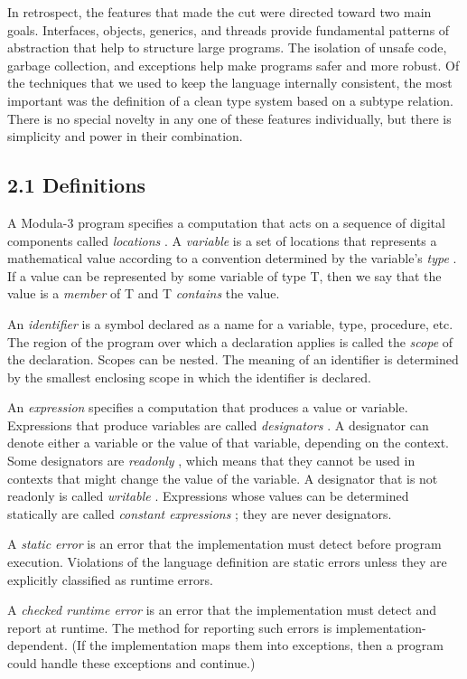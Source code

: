 \documentclass[10pt]{article}
\begin{document}
In retrospect, the features that made the cut were directed toward two main
goals. Interfaces, objects, generics, and threads provide fundamental patterns
of abstraction that help to structure large programs. The isolation of unsafe
code, garbage collection, and exceptions help make programs safer and more
robust. Of the techniques that we used to keep the language internally
consistent, the most important was the definition of a clean type system based
on a subtype relation. There is no special novelty in any one of these
features individually, but there is simplicity and power in their combination.

\subsection*{2.1 Definitions}

A Modula-3 program specifies a computation that acts on a sequence of digital
components called \emph{locations} . A \emph{variable} is a set of locations
that represents a mathematical value according to a convention determined by
the variable's \emph{type} . If a value can be represented by some variable of
type T, then we say that the value is a \emph{member} of T and T
\emph{contains} the value.

An \emph{identifier} is a symbol declared as a name for a variable, type,
procedure, etc. The region of the program over which a declaration applies is
called the \emph{scope} of the declaration. Scopes can be nested. The meaning
of an identifier is determined by the smallest enclosing scope in which the
identifier is declared.

An \emph{expression} specifies a computation that produces a value or
variable. Expressions that produce variables are called \emph{designators} . A
designator can denote either a variable or the value of that variable,
depending on the context. Some designators are \emph{readonly} , which means
that they cannot be used in contexts that might change the value of the
variable. A designator that is not readonly is called \emph{writable}
. Expressions whose values can be determined statically are called
\emph{constant expressions} ; they are never designators.

A \emph{static error} is an error that the implementation must detect before
program execution. Violations of the language definition are static errors
unless they are explicitly classified as runtime errors.

A \emph{checked runtime error} is an error that the implementation must detect
and report at runtime. The method for reporting such errors is
implementation-dependent. (If the implementation maps them into exceptions,
then a program could handle these exceptions and continue.)
\end{document}
